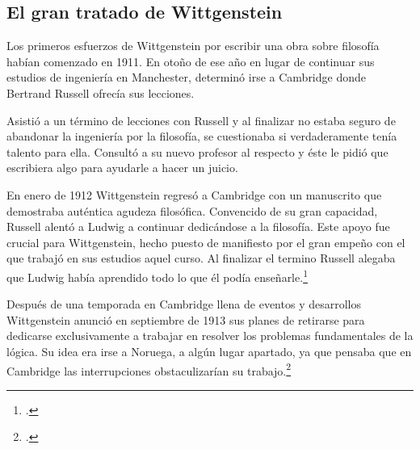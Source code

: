 
\subsection{El gran tratado de Wittgenstein}


Los primeros esfuerzos de Wittgenstein por escribir una obra sobre filosofía
habían comenzado en 1911. En otoño de ese año en lugar de continuar sus estudios
de ingeniería en Manchester, determinó irse a Cambridge donde Bertrand Russell
ofrecía sus lecciones.

Asistió a un término de lecciones con Russell y al finalizar no estaba seguro de
abandonar la ingeniería por la filosofía, se cuestionaba si verdaderamente tenía
talento para ella. Consultó a su nuevo profesor al respecto y éste le pidió que
escribiera algo para ayudarle a hacer un juicio.

En enero de 1912 Wittgenstein regresó a Cambridge con un manuscrito que
demostraba auténtica agudeza filosófica. Convencido de su gran capacidad,
Russell alentó a Ludwig a continuar dedicándose a la filosofía. Este apoyo fue
crucial para Wittgenstein, hecho puesto de manifiesto por el gran empeño con el
que trabajó en sus estudios aquel curso. Al finalizar el termino Russell alegaba
que Ludwig había aprendido todo lo que él podía enseñarle.\footcite[cap. 3 loc
865]{monk}

Después de una temporada en Cambridge llena de eventos y desarrollos
Wittgenstein anunció en septiembre de 1913 sus planes de retirarse para
dedicarse exclusivamente a trabajar en resolver los problemas fundamentales de
la lógica. Su idea era irse a Noruega, a algún lugar apartado, ya que pensaba
que en Cambridge las interrupciones obstaculizarían su trabajo.\footcite[cap. 4
loc 1844]{monk}

